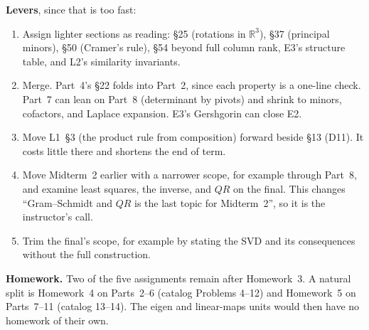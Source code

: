 \documentclass[11pt]{article}
\newcommand{\R}{\mathbb{R}}
\begin{document}
\noindent\textbf{Levers}, since that is too fast:
\begin{enumerate}[label=(\alph*),leftmargin=2em]
  \item Assign lighter sections as reading: \S25 (rotations in $\R^{3}$),
        \S37 (principal minors), \S50 (Cramer's rule), \S54 beyond full
        column rank, E3's structure table, and L2's similarity invariants.
  \item Merge. Part~4's \S22 folds into Part~2, since each property is a
        one-line check. Part~7 can lean on Part~8 (determinant by pivots) and
        shrink to minors, cofactors, and Laplace expansion. E3's Gershgorin can
        close E2.
  \item Move L1~\S3 (the product rule from composition) forward beside \S13
        (D11). It costs little there and shortens the end of term.
  \item Move Midterm~2 earlier with a narrower scope, for example through
        Part~8, and examine least squares, the inverse, and $QR$ on the final.
        This changes ``Gram--Schmidt and $QR$ is the last topic for
        Midterm~2'', so it is the instructor's call.
  \item Trim the final's scope, for example by stating the SVD and its
        consequences without the full construction.
\end{enumerate}

\noindent\textbf{Homework.} Two of the five assignments remain after
Homework~3. A natural split is Homework~4 on Parts~2--6 (catalog Problems
4--12) and Homework~5 on Parts~7--11 (catalog 13--14). The eigen and
linear-maps units would then have no homework of their own.
\end{document}
